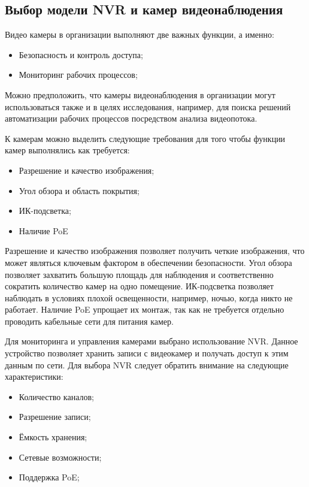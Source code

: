 \subsection{Выбор модели NVR и камер видеонаблюдения}

Видео камеры в организации выполняют две важных функции, а именно:
\begin{itemize}
    \item Безопасность и контроль доступа;
    \item Мониторинг рабочих процессов;
\end{itemize}

Можно предположить, что камеры видеонаблюдения в организации могут использоваться также и в целях исследования, например, для 
поиска решений автоматизации рабочих процессов посредством анализа видеопотока.

К камерам можно выделить следующие требования для того чтобы функции камер выполнялись как требуется:
\begin{itemize}
    \item Разрешение и качество изображения;
    \item Угол обзора и область покрытия;
    \item ИК-подсветка;
    \item Наличие PoE
\end{itemize}

Разрешение и качество изображения позволяет получить четкие изображения, что может являться ключевым фактором в обеспечении безопасности. 
Угол обзора позволяет захватить большую площадь для наблюдения и соответственно сократить количество камер на одно помещение.
ИК-подсветка позволяет наблюдать в условиях плохой освещенности, например, ночью, когда никто не работает. Наличие PoE упрощает их
монтаж, так как не требуется отдельно проводить кабельные сети для питания камер.

Для мониторинга и управления камерами выбрано использование NVR. Данное устройство позволяет хранить записи с видеокамер и получать
доступ к этим данным по сети.
Для выбора NVR следует обратить внимание на следующие характеристики:

\begin{itemize}
    \item Количество каналов;
    \item Разрешение записи;
    \item Ёмкость хранения;
    \item Сетевые возможности;
    \item Поддержка PoE;
\end{itemize}

